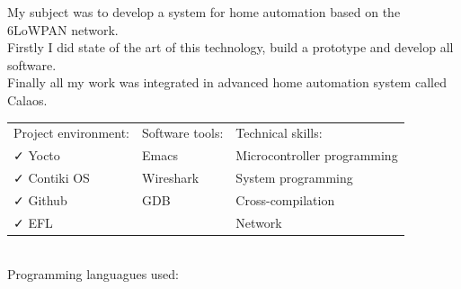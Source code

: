 \documentclass[letterpaper]{jm-cv} %
\begin{document}




\medskip

\small {

  My subject was to develop a system for home automation based on the 6LoWPAN network.\\
  Firstly I did state of the art of this technology, build a prototype and develop all software.\\
  Finally all my work was integrated in advanced home automation system called Calaos.

  \begin{tabular}{ l l l }
    Project environment: & \hspace{1cm}Software tools: & \hspace{1cm}Technical skills:\\
    {\color{mainblue}\faCheck} Yocto &
    \hspace{1cm}{\color{maingreen}\faCheck} Emacs &
    \hspace{1cm}{\color{maingray}\faCheck} Microcontroller programming\\

    {\color{mainblue}\faCheck} Contiki OS &
    \hspace{1cm}{\color{maingreen}\faCheck} Wireshark &
    \hspace{1cm}{\color{maingray}\faCheck} System programming\\

    {\color{mainblue}\faCheck} Github &
    \hspace{1cm}{\color{maingreen}\faCheck} GDB &
    \hspace{1cm}{\color{maingray}\faCheck} Cross-compilation\\

    {\color{mainblue}\faCheck} EFL &
    &
    \hspace{1cm}{\color{maingray}\faCheck} Network\\

  \end{tabular}\\

  Programming languagues used:\\
}
\end{document}

